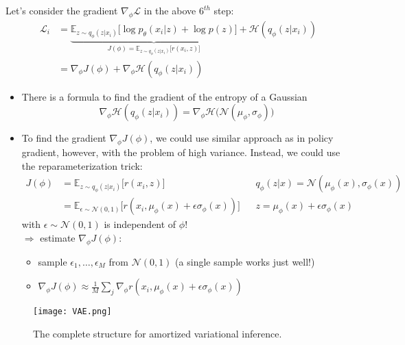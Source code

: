 Let's consider the gradient $\nabla_\phi \mathcal{L}$ in the above $6^{th}$ step:
\begin{align}
	\mathcal{L}_i &= \underbrace{\mathbb{E}_{z\sim q_\phi(z|x_i)} \big[\log p_\theta(x_i|z) + \log p(z)\big]}_{\textstyle J(\phi) = \mathbb{E}_{z\sim q_\phi(z|x_i)} \big[ r(x_i, z)\big]} + \mathcal{H}(q_\phi(z|x_i))\\
	&= \nabla_\phi J(\phi) + \nabla_\phi \mathcal{H}(q_\phi(z|x_i))
\end{align}

\begin{itemize}
	\item There is a formula to find the gradient of the entropy of a Gaussian
	\begin{equation}
		\nabla_\phi \mathcal{H}(q_\phi(z|x_i)) = \nabla_\phi \mathcal{H} \big(\mathcal{N}(\mu_\phi, \sigma_\phi)\big)
	\end{equation}	
	\item To find the gradient $\nabla_\phi J(\phi)$, we could use similar approach as in policy gradient, however, with the problem of high variance. Instead, we could use the reparameterization trick:
	\begin{align}
		J(\phi) & = \mathbb{E}_{z\sim q_\phi(z|x_i)} \big[ r(x_i, z)\big] && q_\phi(z|x) = \mathcal{N}(\mu_\phi(x), \sigma_\phi(x))\\
		& = \mathbb{E}_{\epsilon \sim \mathcal{N}(0,1)} \big[ r(x_i, \mu_\phi(x) + \epsilon \sigma_\phi(x))\big] && z = \mu_\phi(x) + \epsilon \sigma_\phi(x)
	\end{align}
	with $\epsilon \sim \mathcal{N}(0,1)$ is independent of $\phi$!\\
	$\Rightarrow$ estimate $\nabla_\phi J(\phi)$:
	\begin{itemize}
		\item sample $\epsilon_1, \dots, \epsilon_M$ from $\mathcal{N}(0,1)$ (a single sample works just well!)
		\item $\nabla_\phi J(\phi) \approx \frac{1}{M} \sum_j \nabla_\phi r(x_i, \mu_\phi(x) + \epsilon \sigma_\phi(x))$
	\end{itemize}
\end{itemize}

\begin{figure}[hbt!]
	\centering
	\texttt{[image: VAE.png]}
	\caption{The complete structure for amortized variational inference.}
	\label{fig:vae}
\end{figure}

